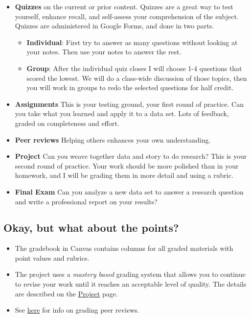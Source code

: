 \documentclass[
  letterpaper,
  DIV=11,
  numbers=noendperiod]{scrartcl}
\providecommand{\tightlist}{%
  \setlength{\itemsep}{0pt}\setlength{\parskip}{0pt}}\usepackage{longtable,booktabs,array}
\begin{document}
\begin{itemize}
\item
  \textbf{Quizzes} on the current or prior content. Quizzes are a great
  way to test yourself, enhance recall, and self-assess your
  comprehension of the subject. Quizzes are administered in Google
  Forms, and done in two parts.

  \begin{itemize}
  \tightlist
  \item
    \textbf{Individual}: First try to answer as many questions without
    looking at your notes. Then use your notes to answer the rest.
  \item
    \textbf{Group}: After the individual quiz closes I will choose 1-4
    questions that scored the lowest. We will do a class-wide discussion
    of those topics, then you will work in groups to redo the selected
    questions for half credit.
  \end{itemize}
\item
  \textbf{Assignments} This is your testing ground, your first round of
  practice. Can you take what you learned and apply it to a data set.
  Lots of feedback, graded on completeness and effort.
\item
  \textbf{Peer reviews} Helping others enhances your own understanding.
\item
  \textbf{Project} Can you weave together data and story to do research?
  This is your second round of practice. Your work should be more
  polished than in your homework, and I will be grading them in more
  detail and using a rubric.
\item
  \textbf{Final Exam} Can you analyze a new data set to answer a
  research question and write a professional report on your results?
\end{itemize}

\hypertarget{okay-but-what-about-the-points}{%
\subsection{Okay, but what about the
points?}\label{okay-but-what-about-the-points}}

\begin{itemize}
\tightlist
\item
  The gradebook in Canvas contains columns for all graded materials with
  point values and rubrics.
\item
  The project uses a \emph{mastery based} grading system that allows you
  to continue to revise your work until it reaches an acceptable level
  of quality. The details are described on the
  \href{https://math615.netlify.app/project.html\#grading-method}{Project}
  page.
\item
  See
  \href{https://math615.netlify.app/help.html\#grading-of-peer-reviews}{here}
  for info on grading peer reviews.
\end{itemize}
\end{document}
